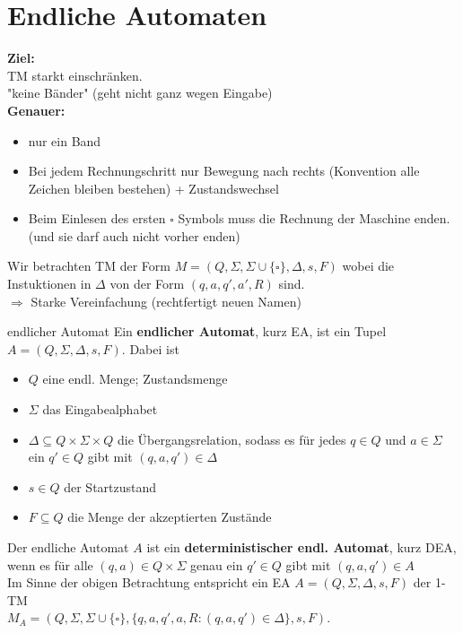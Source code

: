
\section{Endliche Automaten}
 
\textbf{Ziel:}\\
TM starkt einschränken. \\
"keine Bänder" (geht nicht ganz wegen Eingabe)\\

\textbf{Genauer:}
\begin{itemize}
    \item nur ein Band
    \item Bei jedem Rechnungschritt nur Bewegung nach rechts (Konvention alle Zeichen bleiben bestehen) + Zustandswechsel
    \item Beim Einlesen des ersten $\square$ Symbols muss die Rechnung der Maschine enden. (und sie darf auch nicht vorher enden)
\end{itemize} 

Wir betrachten TM der Form $M = (Q, \Sigma, \Sigma \cup \{\square\}, \Delta, s, F)$ wobei
die Instuktionen in $\Delta$ von der Form $(q,a,q',a',R)$ sind. \\
$\Rightarrow$ Starke Vereinfachung (rechtfertigt neuen Namen)

\begin{defn}{endlicher Automat}
    Ein \textbf{endlicher Automat}, kurz EA, ist ein Tupel $A = (Q, \Sigma, \Delta, s,F)$.
    Dabei ist
    \begin{itemize}
        \item $Q$ eine endl. Menge; Zustandsmenge
        \item $\Sigma$ das Eingabealphabet
        \item $\Delta \subseteq Q \times \Sigma \times Q$ die Übergangsrelation, 
              sodass es für jedes $q \in Q$ und $a \in \Sigma$ ein $q' \in Q$ gibt mit 
              $(q,a,q') \in \Delta$
        \item $s \in Q$ der Startzustand
        \item $F \subseteq Q$ die Menge der akzeptierten Zustände
    \end{itemize}

    Der endliche Automat $A$ ist ein \textbf{deterministischer endl. Automat}, kurz DEA,
    wenn es für alle $(q,a) \in Q \times \Sigma$ genau ein $q' \in Q$ gibt mit $(q,a,q') \in A$ \\

    Im Sinne der obigen Betrachtung entspricht ein EA $A=(Q, \Sigma, \Delta, s, F)$ der 1-TM \\
    $M_A = (Q, \Sigma, \Sigma \cup \{\square\},\{q,a,q',a,R:(q,a,q') \in \Delta\},s,F)$.
\end{defn}

